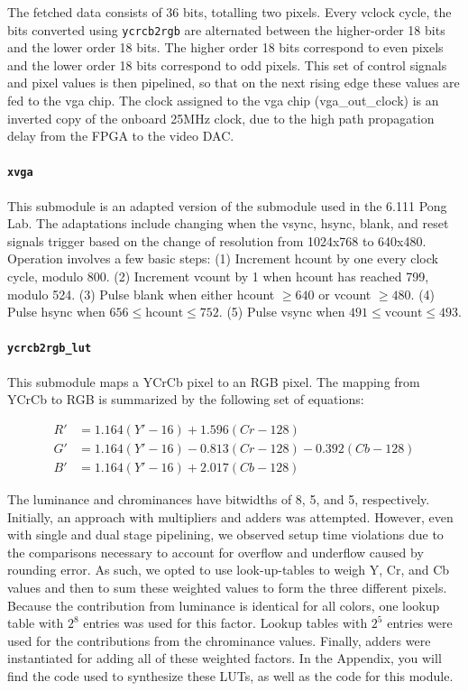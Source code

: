 \documentclass[10pt]{article}
\begin{document}
The fetched data consists of 36 bits, totalling two pixels. Every vclock cycle, the bits converted using {\tt ycrcb2rgb} are alternated between the higher-order 18 bits and the lower order 18 bits. The higher order 18 bits correspond to even pixels and the lower order 18 bits correspond to odd pixels. This set of control signals and pixel values is then pipelined, so that on the next rising edge these values are fed to the vga chip. The clock assigned to the vga chip (vga\_out\_clock) is an inverted copy of the onboard 25MHz clock, due to the high path propagation delay from the FPGA to the video DAC.

\paragraph{{\tt xvga}}
This submodule is an adapted version of the submodule used in the 6.111 Pong Lab. The adaptations include changing when the vsync, hsync, blank, and reset signals trigger based on the change of resolution from 1024x768 to 640x480. Operation involves a few basic steps\cite{xvga}: (1) Increment hcount by one every clock cycle, modulo 800. (2) Increment vcount by 1 when hcount has reached 799, modulo 524. (3) Pulse blank when either hcount $\geq 640$ or vcount $\geq 480$. (4) Pulse hsync when $656 \leq \text{hcount} \leq 752$. (5) Pulse vsync when $491 \leq \text{vcount} \leq 493$.

\paragraph{{\tt ycrcb2rgb\_lut}}
This submodule maps a YCrCb pixel to an RGB pixel. The mapping from YCrCb to RGB is summarized by the following set of equations\cite{ycrcb}:

\begin{align*}
R' & = 1.164(Y'-16) + 1.596(Cr-128) \\
G' & = 1.164(Y'-16) - 0.813(Cr-128) - 0.392(Cb-128) \\
B' & = 1.164(Y'-16) + 2.017(Cb-128)
\end{align*}

The luminance and chrominances have bitwidths of 8, 5, and 5, respectively. Initially, an approach with multipliers and adders was attempted. However, even with single and dual stage pipelining, we observed setup time violations due to the comparisons necessary to account for overflow and underflow caused by rounding error. As such, we opted to use look-up-tables to weigh Y, Cr, and Cb values and then to sum these weighted values to form the three different pixels. Because the contribution from luminance is identical for all colors, one lookup table with \( 2^8 \) entries was used for this factor. Lookup tables with \( 2^5 \) entries were used for the contributions from the chrominance values. Finally, adders were instantiated for adding all of these weighted factors. In the Appendix, you will find the code used to synthesize these LUTs, as well as the code for this module.
\end{document}
